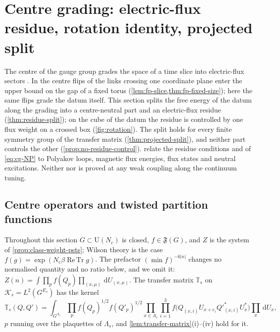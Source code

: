 \documentclass[11pt,a4paper]{amsart}
\theoremstyle{definition}
\theoremstyle{remark}
\numberwithin{equation}{section}
\DeclareMathOperator{\ReTr}{Re\,Tr}  %
\newcommand{\Kspace}{\mathcal{K}}    %
\newcommand{\Fclass}{\mathfrak{F}}   %
\newcommand{\dd}{\,\mathrm{d}}             %
\newcommand{\U}{\mathrm{U}}                %
\newcommand{\TT}{\mathbb{T}}               %
\newcommand{\hypN}{\text{\upshape(N)}}              %
\newcommand{\hypP}{\text{\upshape(P)}}              %
\begin{document}
\section{Centre grading: electric-flux residue, rotation identity, projected split}\label{sec:centre}

The centre of the gauge group grades the space of a time slice into electric-flux sectors \cite{thooft1979}. In \cite{bhattacharjee2026first} the centre flips of the links crossing one coordinate plane enter the upper bound on the gap of a fixed torus (\cref{lem:fp-slice,thm:fp-fixed-size}); here the same flips grade the datum itself. This section splits the free energy of the datum along the grading into a centre-neutral part and an electric-flux residue (\cref{thm:residue-split}); on the cube of the datum the residue is controlled by one flux weight on a crossed box (\cref{fig:rotation}). The split holds for every finite symmetry group of the transfer matrix (\cref{thm:projected-split}), and neither part controls the other (\cref{prop:no-residue-control}).  relate the residue conditions \hypN{} and \hypP{} of \eqref{eq:cg-NP} to Polyakov loops, magnetic flux energies, flux states and neutral excitations. Neither \hypN{} nor \hypP{} is proved at any weak coupling along the continuum tuning.

\subsection{Centre operators and twisted partition functions}

Throughout this section $G\subset\U(N_c)$ is closed, $f\in\Fclass(G)$, and $Z$ is the system of \cref{prop:class-weight-psts}; Wilson theory is the case $f(g)=\exp(N_c\beta\ReTr g)$. The prefactor $(\min f)^{-6|n|}$ changes no normalised quantity and no ratio below, and we omit it: $Z(n)=\int\prod_pf(Q_p)\prod_{(x,\mu)}\dd U_{(x,\mu)}$. The transfer matrix $\TT_s$ on $\Kspace_s=L^2(G^{E_s})$ has the kernel
\begin{equation}\label{eq:cg-kernel}
\TT_s(Q,Q')=\int_{G^{\Lambda_s}}\prod_pf(Q_p)^{1/2}f(Q'_p)^{1/2}\prod_{x\in\Lambda_s}\prod_{i=1}^3f\bigl(Q_{(x,i)}U_{x+e_i}Q'^*_{(x,i)}U_x^*\bigr)\prod_{x}\dd U_x ,
\end{equation}
$p$ running over the plaquettes of $\Lambda_s$, and \cref{lem:transfer-matrix}\textup{(i)--(iv)} hold for it.
\end{document}
